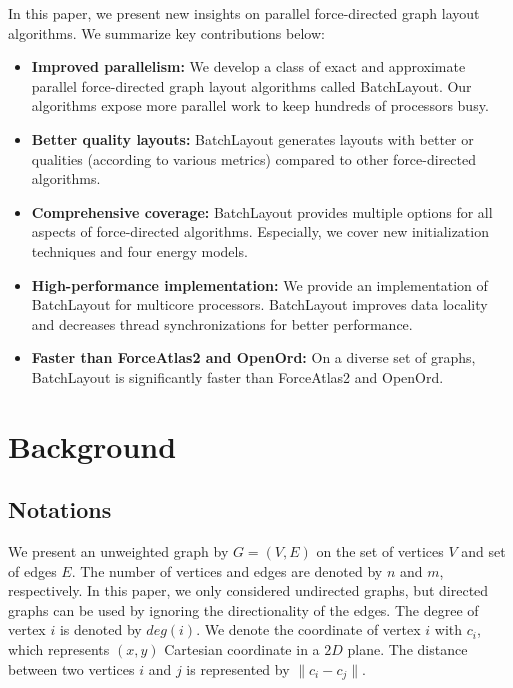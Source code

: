 \documentclass{vgtc}
\newcommand{\commentKhaled}[1]{{\color{black}{#1}}}
\newcommand{\toolname}{{BatchLayout}}
\begin{document}
In this paper, we present new insights on parallel force-directed graph layout algorithms. We summarize key contributions below:
\begin{itemize}[leftmargin=*]
    \setlength\itemsep{0.02em}
    \item {\bf Improved parallelism:} We develop a class of exact and approximate parallel force-directed graph layout algorithms called \toolname{}. Our algorithms expose more parallel work to keep hundreds of processors busy.
    \item {\bf Better quality layouts:}  \toolname{} generates layouts with better or \commentKhaled{similar} qualities (according to various metrics) compared to other force-directed algorithms. 
    \item {\bf Comprehensive coverage:} \toolname{} provides multiple options for all aspects of force-directed algorithms. Especially, we cover new initialization techniques and four energy models.
    \item {\bf High-performance implementation:} We provide an implementation of \toolname{} for multicore processors. 
    \toolname{} improves data locality and decreases thread synchronizations for better performance. 
    \item {\bf Faster than ForceAtlas2 and OpenOrd:} On a diverse set of graphs, \toolname{} is significantly faster than ForceAtlas2 and OpenOrd.  
    
\end{itemize}




\section{Background}
\subsection{Notations}
We present an unweighted graph by ${G=(V,E)}$ on the set of vertices $V$ and set of edges $E$. 
The number of vertices and edges are denoted by $n$ and $m$, respectively.
In this paper, we only considered undirected graphs, but directed graphs can be used by ignoring the directionality of the edges. 
The degree of vertex $i$ is denoted by $deg(i)$.
We denote the coordinate of vertex $i$ with $c_i$, which represents $(x,y)$ Cartesian coordinate in a $2D$ plane. The distance between two vertices $i$ and $j$ is represented by $\parallel c_i - c_j \parallel$.
\end{document}
